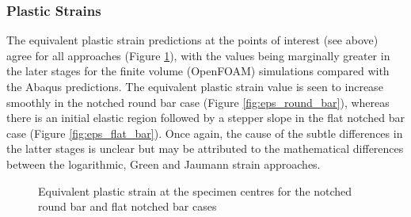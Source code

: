 \documentclass[sn-mathphys,Numbered]{sn-jnl}%
\begin{document}
\subsubsection{Plastic Strains}

The equivalent plastic strain predictions at the points of interest (see above) agree for all approaches (Figure \ref{fig:eqPlasticStrainPlasticity}), with the values being marginally greater in the later stages for the finite volume (OpenFOAM) simulations compared with the Abaqus predictions.
The equivalent plastic strain value is seen to increase smoothly in the notched round bar case (Figure \ref{fig:eps_round_bar}), whereas there is an initial elastic region followed by a stepper slope in the flat notched bar case (Figure \ref{fig:eps_flat_bar}).
Once again, the cause of the subtle differences in the latter stages is unclear but may be attributed to the mathematical differences between the logarithmic, Green and Jaumann strain approaches.
\begin{figure}[htbp]
	\centering
	\caption{Equivalent plastic strain at the specimen centres for the notched round bar and flat notched bar cases}
	\label{fig:eqPlasticStrainPlasticity}
\end{figure}
\end{document}
